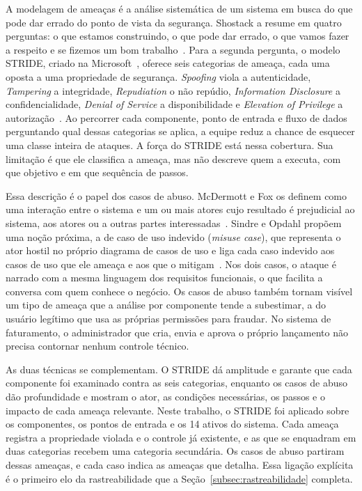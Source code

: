 \documentclass[conference]{IEEEtran}
\begin{document}
A modelagem de ameaças é a análise sistemática de um sistema em busca do que pode dar errado do ponto de vista da segurança. Shostack a resume em quatro perguntas: o que estamos construindo, o que pode dar errado, o que vamos fazer a respeito e se fizemos um bom trabalho~\cite{shostack2014}. Para a segunda pergunta, o modelo STRIDE, criado na Microsoft~\cite{kohnfelder1999}, oferece seis categorias de ameaça, cada uma oposta a uma propriedade de segurança. \textit{Spoofing} viola a autenticidade, \textit{Tampering} a integridade, \textit{Repudiation} o não repúdio, \textit{Information Disclosure} a confidencialidade, \textit{Denial of Service} a disponibilidade e \textit{Elevation of Privilege} a autorização~\cite{shostack2014}. Ao percorrer cada componente, ponto de entrada e fluxo de dados perguntando qual dessas categorias se aplica, a equipe reduz a chance de esquecer uma classe inteira de ataques. A força do STRIDE está nessa cobertura. Sua limitação é que ele classifica a ameaça, mas não descreve quem a executa, com que objetivo e em que sequência de passos.

Essa descrição é o papel dos casos de abuso. McDermott e Fox os definem como uma interação entre o sistema e um ou mais atores cujo resultado é prejudicial ao sistema, aos atores ou a outras partes interessadas~\cite{mcdermott1999}. Sindre e Opdahl propõem uma noção próxima, a de caso de uso indevido (\textit{misuse case}), que representa o ator hostil no próprio diagrama de casos de uso e liga cada caso indevido aos casos de uso que ele ameaça e aos que o mitigam~\cite{sindre2005}. Nos dois casos, o ataque é narrado com a mesma linguagem dos requisitos funcionais, o que facilita a conversa com quem conhece o negócio. Os casos de abuso também tornam visível um tipo de ameaça que a análise por componente tende a subestimar, a do usuário legítimo que usa as próprias permissões para fraudar. No sistema de faturamento, o administrador que cria, envia e aprova o próprio lançamento não precisa contornar nenhum controle técnico.

As duas técnicas se complementam. O STRIDE dá amplitude e garante que cada componente foi examinado contra as seis categorias, enquanto os casos de abuso dão profundidade e mostram o ator, as condições necessárias, os passos e o impacto de cada ameaça relevante. Neste trabalho, o STRIDE foi aplicado sobre os componentes, os pontos de entrada e os 14 ativos do sistema. Cada ameaça registra a propriedade violada e o controle já existente, e as que se enquadram em duas categorias recebem uma categoria secundária. Os casos de abuso partiram dessas ameaças, e cada caso indica as ameaças que detalha. Essa ligação explícita é o primeiro elo da rastreabilidade que a Seção~\ref{subsec:rastreabilidade} completa.
\end{document}

